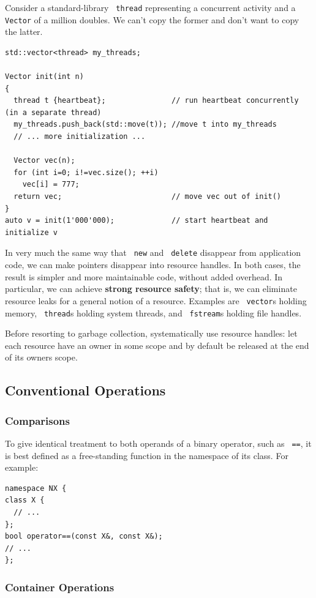 \documentclass[11pt]{article}
\let\OldTexttt\texttt
\renewcommand{\texttt}[1]{\OldTexttt{\color{MidnightBlue} #1}}
\begin{document}
Consider a standard-library \texttt{thread} representing a concurrent activity and a \texttt{Vector} of
a million doubles. We can't copy the former and don't want to copy the latter.
\begin{verbatim}
std::vector<thread> my_threads;

Vector init(int n)
{
  thread t {heartbeat};               // run heartbeat concurrently (in a separate thread)
  my_threads.push_back(std::move(t)); //move t into my_threads
  // ... more initialization ...
  
  Vector vec(n);
  for (int i=0; i!=vec.size(); ++i)
    vec[i] = 777;
  return vec;                         // move vec out of init()
}
auto v = init(1'000'000);             // start heartbeat and initialize v
\end{verbatim}

In very much the same way that \texttt{new} and \texttt{delete} disappear from application code, we can make
pointers disappear into resource handles. In both cases, the result is simpler and more
maintainable code, without added overhead. In particular, we can achieve \textbf{strong resource safety};
that is, we can eliminate resource leaks for a general notion of a resource. Examples are
\texttt{vector}s holding memory, \texttt{thread}s holding system threads, and \texttt{fstream}s
holding file handles.

Before resorting to garbage collection, systematically use resource handles: let each resource
have an owner in some scope and by default be released at the end of its owners scope.
\subsection{Conventional Operations}
\label{sec:orga073bfb}
\subsubsection{Comparisons}
\label{sec:org181fa4f}
To give identical treatment to both operands of a binary operator, such as \texttt{==}, it is best
defined as a free-standing function in the namespace of its class. For example:
\begin{verbatim}
namespace NX {
class X {
  // ...
};
bool operator==(const X&, const X&);
// ...
};
\end{verbatim}
\subsubsection{Container Operations}
\label{sec:org4d1db87}
\end{document}
